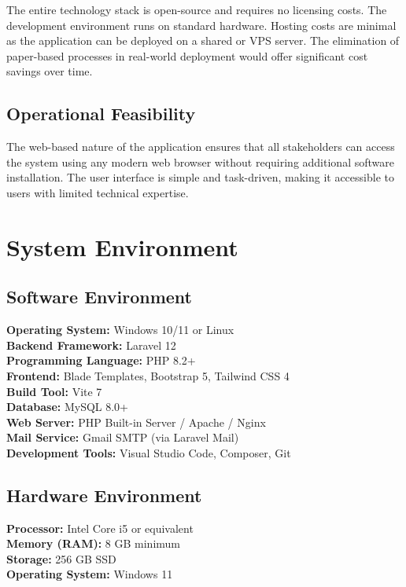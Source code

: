 The entire technology stack is open-source and requires no licensing costs. The development environment runs on standard hardware. Hosting costs are minimal as the application can be deployed on a shared or VPS server. The elimination of paper-based processes in real-world deployment would offer significant cost savings over time.

\subsection{Operational Feasibility}

The web-based nature of the application ensures that all stakeholders can access the system using any modern web browser without requiring additional software installation. The user interface is simple and task-driven, making it accessible to users with limited technical expertise.

\section{System Environment}

\subsection{Software Environment}

\textbf{Operating System:} Windows 10/11 or Linux \\
\textbf{Backend Framework:} Laravel 12 \\
\textbf{Programming Language:} PHP 8.2+ \\
\textbf{Frontend:} Blade Templates, Bootstrap 5, Tailwind CSS 4 \\
\textbf{Build Tool:} Vite 7 \\
\textbf{Database:} MySQL 8.0+ \\
\textbf{Web Server:} PHP Built-in Server / Apache / Nginx \\
\textbf{Mail Service:} Gmail SMTP (via Laravel Mail) \\
\textbf{Development Tools:} Visual Studio Code, Composer, Git \\

\subsection{Hardware Environment}

\textbf{Processor:} Intel Core i5 or equivalent \\
\textbf{Memory (RAM):} 8 GB minimum \\
\textbf{Storage:} 256 GB SSD \\
\textbf{Operating System:} Windows 11 \\
